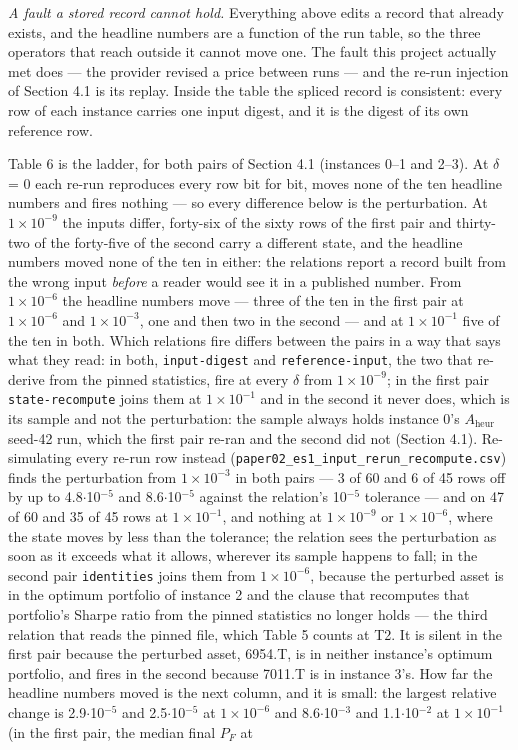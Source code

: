 \documentclass[acmsmall,screen,review]{acmart}
\begin{document}
\textit{A fault a stored record cannot hold.} Everything above edits a record that already exists, and the headline numbers are a function of the run table, so the three operators that reach outside it cannot move one. The fault this project actually met does --- the provider revised a price between runs --- and the re-run injection of Section 4.1 is its replay. Inside the table the spliced record is consistent: every row of each instance carries one input digest, and it is the digest of its own reference row.


Table 6 is the ladder, for both pairs of Section 4.1 (instances 0--1 and 2--3). At $\delta$ = 0 each re-run reproduces every row bit for bit, moves none of the ten headline numbers and fires nothing --- so every difference below is the perturbation. At $1\times 10^{-9}$ the inputs differ, forty-six of the sixty rows of the first pair and thirty-two of the forty-five of the second carry a different state, and the headline numbers moved none of the ten in either: the relations report a record built from the wrong input \textit{before} a reader would see it in a published number. From $1\times 10^{-6}$ the headline numbers move --- three of the ten in the first pair at $1\times 10^{-6}$ and $1\times 10^{-3}$, one and then two in the second --- and at $1\times 10^{-1}$ five of the ten in both. Which relations fire differs between the pairs in a way that says what they read: in both, \texttt{input-digest} and \texttt{reference-input}, the two that re-derive from the pinned statistics, fire at every $\delta$ from $1\times 10^{-9}$; in the first pair \texttt{state-recompute} joins them at $1\times 10^{-1}$ and in the second it never does, which is its sample and not the perturbation: the sample always holds instance 0's $A_{\mathrm{heur}}$ seed-42 run, which the first pair re-ran and the second did not (Section 4.1). Re-simulating every re-run row instead (\texttt{paper02\_\allowbreak{}es1\_\allowbreak{}input\_\allowbreak{}rerun\_\allowbreak{}recompute.\allowbreak{}csv}) finds the perturbation from $1\times 10^{-3}$ in both pairs --- 3 of 60 and 6 of 45 rows off by up to 4.8$\cdot$10$^{-5}$ and 8.6$\cdot$10$^{-5}$ against the relation's 10$^{-5}$ tolerance --- and on 47 of 60 and 35 of 45 rows at $1\times 10^{-1}$, and nothing at $1\times 10^{-9}$ or $1\times 10^{-6}$, where the state moves by less than the tolerance; the relation sees the perturbation as soon as it exceeds what it allows, wherever its sample happens to fall; in the second pair \texttt{identities} joins them from $1\times 10^{-6}$, because the perturbed asset is in the optimum portfolio of instance 2 and the clause that recomputes that portfolio's Sharpe ratio from the pinned statistics no longer holds --- the third relation that reads the pinned file, which Table 5 counts at T2. It is silent in the first pair because the perturbed asset, 6954.T, is in neither instance's optimum portfolio, and fires in the second because 7011.T is in instance 3's. How far the headline numbers moved is the next column, and it is small: the largest relative change is 2.9$\cdot$10$^{-5}$ and 2.5$\cdot$10$^{-5}$ at $1\times 10^{-6}$ and 8.6$\cdot$10$^{-3}$ and 1.1$\cdot$10$^{-2}$ at $1\times 10^{-1}$ (in the first pair, the median final $P_{F}$ at 
\end{document}
